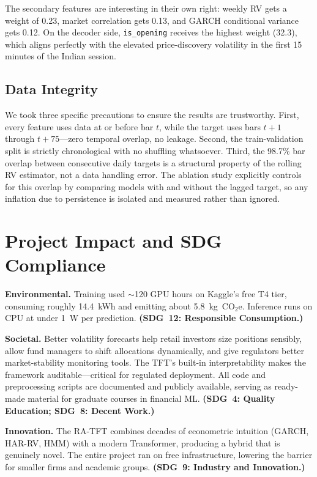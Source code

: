The secondary features are interesting in their own right: weekly RV gets a weight of 0.23, market correlation gets 0.13, and GARCH conditional variance gets 0.12. On the decoder side, \texttt{is\_opening} receives the highest weight (32.3), which aligns perfectly with the elevated price-discovery volatility in the first 15 minutes of the Indian session.

\subsection{Data Integrity}

We took three specific precautions to ensure the results are trustworthy. First, every feature uses data at or before bar $t$, while the target uses bars $t+1$ through $t+75$---zero temporal overlap, no leakage. Second, the train-validation split is strictly chronological with no shuffling whatsoever. Third, the 98.7\% bar overlap between consecutive daily targets is a structural property of the rolling RV estimator, not a data handling error. The ablation study explicitly controls for this overlap by comparing models with and without the lagged target, so any inflation due to persistence is isolated and measured rather than ignored.



\section{Project Impact and SDG Compliance}

\textbf{Environmental.} Training used $\sim$120 GPU hours on Kaggle's free T4 tier, consuming roughly 14.4~kWh and emitting about 5.8~kg~CO$_2$e. Inference runs on CPU at under 1~W per prediction. \textbf{(SDG~12: Responsible Consumption.)}

\textbf{Societal.} Better volatility forecasts help retail investors size positions sensibly, allow fund managers to shift allocations dynamically, and give regulators better market-stability monitoring tools. The TFT's built-in interpretability makes the framework auditable---critical for regulated deployment. All code and preprocessing scripts are documented and publicly available, serving as ready-made material for graduate courses in financial ML. \textbf{(SDG~4: Quality Education; SDG~8: Decent Work.)}

\textbf{Innovation.} The RA-TFT combines decades of econometric intuition (GARCH, HAR-RV, HMM) with a modern Transformer, producing a hybrid that is genuinely novel. The entire project ran on free infrastructure, lowering the barrier for smaller firms and academic groups. \textbf{(SDG~9: Industry and Innovation.)}

